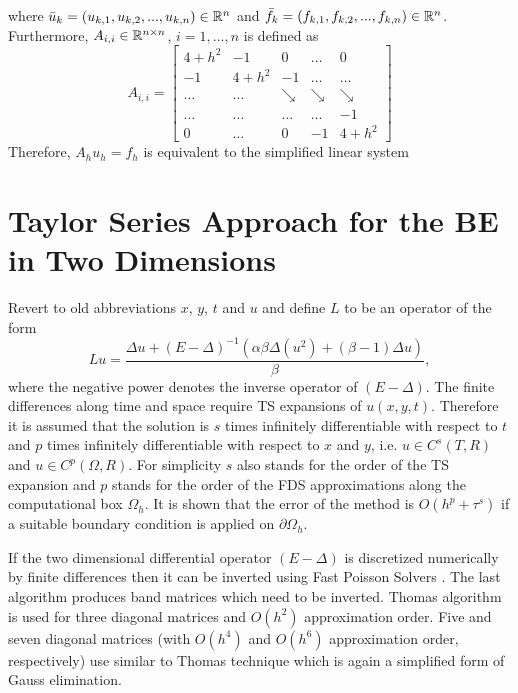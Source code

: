 \documentclass[11pt,a4paper,twoside]{article}
\begin{document}
where $\bar u_k = (u_{k,1}, u_{k,2}, ..., u_{k,n})\in \mathbb{R}^{n}$ and $\bar f_k = (f_{k,1}, f_{k,2}, ..., f_{k,n})\in \mathbb{R}^{n}$. Furthermore, $A_{i,i} \in \mathbb{R}^{n \times n}$, $i = 1, ..., n$ is defined as
\[
A_{i,i} = 
\begin{bmatrix}
    4+h^2       & -1          &  0              & \dots & 0 \\
    -1               & 4+h^2  & -1              & \dots & \dots  \\
      \dots         & \dots     & \searrow  & \searrow  & \searrow  \\
      \dots         & \dots    & \dots         & \dots & -1  \\
     0                 & \dots   &  0               & -1    & 4+h^2
\end{bmatrix}
\]
Therefore, $A_h u_h = f_h$ is equivalent to the simplified linear system

\section{Taylor Series Approach for the BE in Two Dimensions}\label{TaylorA}

Revert to old abbreviations $x$, $y$, $t$ and $u$ and define $L$ to be an operator of the form
\begin{equation}\label{operator}
Lu = \frac{\Delta u + (E-\Delta)^{-1} ( \alpha \beta \Delta( u^2) + (\beta -1)\Delta u)}{\beta},
\end{equation}
where the negative power denotes the inverse operator of $(E-\Delta)$. The finite differences along time and space require TS expansions of $u(x,y,t)$. Therefore it is assumed that the solution is $s$ times infinitely differentiable with respect to $t$ and $p$ times infinitely differentiable with respect to $x$ and $y$, i.e. $u \in C^s(T, R)$ and $u \in C^p(\Omega, R)$. For simplicity $s$ also stands for the order of the TS expansion and $p$ stands for the order of the FDS approximations along the computational box $\Omega_h$. It is shown that the error of the method is $O(h^p + \tau^s)$ if a suitable boundary condition is applied on $\partial \Omega_h$.

If the two dimensional differential operator $(E-\Delta)$ is discretized numerically by finite differences then it can be inverted using Fast Poisson Solvers \cite{FPS}. The last algorithm produces band matrices which need to be inverted. Thomas algorithm is used for three diagonal matrices and $O(h^2)$ approximation order.  Five and seven diagonal matrices (with $O(h^4)$ and $O(h^6)$ approximation order, respectively) use similar to Thomas technique which is again a simplified form of Gauss elimination.
\end{document}
